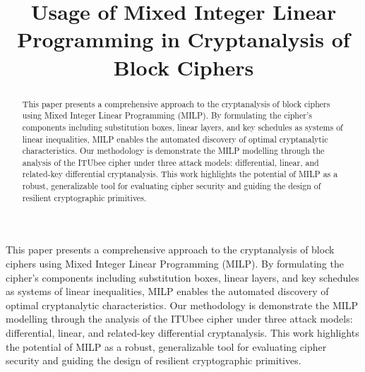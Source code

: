 \documentclass [version=final]{iacrcc}
\title[running  = {Usage of Mixed Integer Linear Programming in Cryptanalysis of Block Ciphers},
       subtitle = {}
      ]{Usage of Mixed Integer Linear Programming in Cryptanalysis of Block Ciphers}
\begin{document}
\maketitle



\begin{abstract}
  This paper presents a comprehensive approach to the cryptanalysis of block ciphers using Mixed Integer Linear Programming (MILP). By formulating the cipher’s components including substitution boxes, linear layers, and key schedules as systems of linear inequalities, MILP enables the automated discovery of optimal cryptanalytic characteristics. Our methodology is demonstrate the MILP modelling through the analysis of the ITUbee cipher under three attack models: differential, linear, and related-key differential cryptanalysis. This work highlights the potential of MILP as a robust, generalizable tool for evaluating cipher security and guiding the design of resilient cryptographic primitives.
\end{abstract}

\begin{textabstract}
  This paper presents a comprehensive approach to the cryptanalysis of block ciphers using Mixed Integer Linear Programming (MILP). By formulating the cipher’s components including substitution boxes, linear layers, and key schedules as systems of linear inequalities, MILP enables the automated discovery of optimal cryptanalytic characteristics. Our methodology is demonstrate the MILP modelling through the analysis of the ITUbee cipher under three attack models: differential, linear, and related-key differential cryptanalysis. This work highlights the potential of MILP as a robust, generalizable tool for evaluating cipher security and guiding the design of resilient cryptographic primitives.
\end{textabstract}

\end{document}
